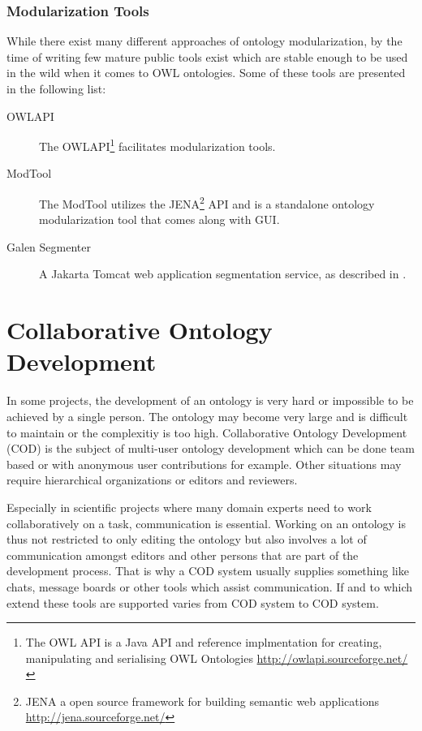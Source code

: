 \subsubsection{Modularization Tools}
While there exist many different approaches of ontology modularization,
by the time of writing few mature public tools exist which are stable enough
to be used in the wild when it comes to OWL ontologies. Some of these tools
are presented in the following list:
\begin{description}
       \item[OWLAPI] The OWLAPI\footnote{The OWL API is a Java API and
                        reference implmentation for creating, manipulating and serialising
                        OWL Ontologies \url{http://owlapi.sourceforge.net/}} facilitates modularization tools.
       \item[ModTool] The ModTool utilizes the JENA\footnote{JENA a open
                source framework for building semantic web applications
                \url{http://jena.sourceforge.net/}}
                API and is a standalone ontology modularization tool that comes along with GUI.
        \item[Galen Segmenter] A Jakarta Tomcat web application segmentation service,
                as described in \cite{seidenberg2006}.
\end{description}


\section{Collaborative Ontology Development}
In some projects, the development of an ontology is very hard or impossible
to be achieved by a single person. The ontology may become very large
and is difficult to maintain or the complexitiy is too high.
Collaborative Ontology Development (COD) is the subject of multi-user
ontology development which can be done team based or with anonymous user
contributions for example. Other situations may require hierarchical
organizations or editors and reviewers.

Especially in scientific projects where many domain experts need to work
collaboratively on a task, communication is essential. Working on an ontology
is thus not restricted to only editing the ontology but also involves
a lot of communication amongst editors and other persons that are part
of the development process. That is why a COD system usually supplies something
like chats, message boards or other tools which assist communication.
If and to which extend these tools are supported varies from COD system
to COD system.

